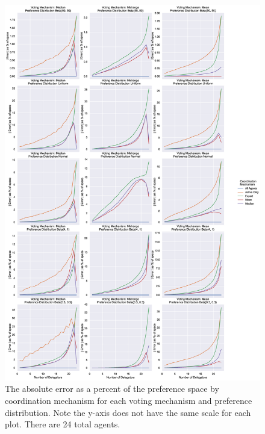 %
%


\makeappendices

\renewcommand\thefigure{A.\arabic{figure}}

\begin{figure}[p]
    \centering
    \includegraphics[scale=0.30]
    {content/chapter2/figures/distribution_different_scale_error_as_percent_of_space_abs_mean}
    \caption{
        The absolute error as a percent of the preference space by coordination
        mechanism for each voting mechanism and preference distribution.
        Note the y-axis does not have the same scale for each plot.
        There are 24 total agents.
    }
    \label{fig:distribution-different-scale-error-as-percent-of-space-abs-mean}
\end{figure}


